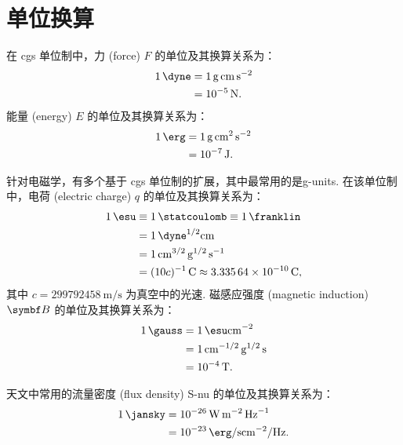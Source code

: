 
\chapter{单位换算}
\label{app:units}

在 \ac{cgs} 单位制中，力 (force) $F$ 的单位及其换算关系为：
\begin{align}
  \label{eq:cgs-force}
  \SI{1}{\dyne}
    & = \SI{1}{\gram \cm \second\tothe{-2}} \\
    & = \SI{e-5}{\newton} .
\end{align}
能量 (energy) $E$ 的单位及其换算关系为：
\begin{align}
  \label{eq:cgs-work}
  \SI{1}{\erg}
    & = \SI{1}{\gram \cm\tothe{2} \second\tothe{-2}} \\
    & = \SI{e-7}{\joule} .
\end{align}

针对电磁学，有多个基于 \ac{cgs} 单位制的扩展，其中最常用的是\ac{g-units}.
在该单位制中，电荷 (electric charge) $q$ 的单位及其换算关系为：
\begin{align}
  \label{eq:gu-electrical-charge}
  \SI{1}{\esu}
    & \equiv \SI{1}{\statcoulomb} \equiv \SI{1}{\franklin} \\
    & = \SI{1}{\dyne\tothe{1/2} \cm} \\
    & = \SI{1}{\cm\tothe{3/2} \gram\tothe{1/2} \per\second} \\
    & = (10 c)^{-1}\,\si{\coulomb} \approx \SI{3.33564e-10}{\coulomb} ,
\end{align}
其中 $c = \SI{299792458}{\meter\per\second} $ 为真空中的光速.
磁感应强度 (magnetic induction) $\B{B}$ 的单位及其换算关系为：
\begin{align}
  \label{eq:gu-b-field}
  \SI{1}{\gauss}
    & = \SI{1}{\esu \cm\tothe{-2}} \\
    & = \SI{1}{\cm\tothe{-1/2} \gram\tothe{1/2} \second} \\
    & = \SI{e-4}{\tesla} .
\end{align}

天文中常用的流量密度 (flux density) \acs{S-nu} 的单位及其换算关系为：
\begin{align}
  \label{eq:jy-conv}
  \SI{1}{\jansky}
    & = \SI{e-26}{\watt \meter\tothe{-2} \per\hertz} \\
    & = \SI{e-23}{\erg \per\second \cm\tothe{-2} \per\hertz} .
\end{align}


